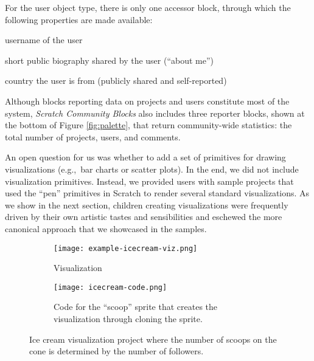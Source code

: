 \documentclass{sigchi}
\newenvironment{itemize*}%
  {\begin{itemize}%
    \setlength{\itemsep}{2pt}%
    \setlength{\parskip}{0pt}}%
  {\end{itemize}}
\begin{document}
For the user object type, there is only one accessor block, through which the following properties are made available:

\begin{itemize*}
    \item username of the user
    \item short public biography shared by the user (``about me'')
    \item country the user is from (publicly shared and self-reported)
\end{itemize*}

Although blocks reporting data on projects and users constitute most of the system, \emph{Scratch Community Blocks} also includes three reporter blocks, shown at the bottom of Figure \ref{fig:palette}, that return community-wide statistics: the total number of projects, users, and comments.

An open question for us was whether to add a set of primitives for drawing visualizations (e.g.,~bar charts or scatter plots). In the end, we did not include visualization primitives. Instead, we provided users with sample projects that used the ``pen'' primitives in Scratch to render several standard visualizations. As we show in the next section, children creating visualizations were frequently driven by their own artistic tastes and sensibilities and eschewed the more canonical approach that we showcased in the samples.

\begin{figure*}[ht]
    \centering
    \begin{subfigure}[t]{0.33\textwidth}
        \centering
        \texttt{[image: example-icecream-viz.png]}
        \caption{Visualization}
        \label{fig:example-3-viz}
    \end{subfigure}
    \hfill
    \begin{subfigure}[t]{0.65\textwidth}
        \centering
        \texttt{[image: icecream-code.png]}
        \caption{Code for the ``scoop'' sprite that creates the visualization through cloning the sprite.}
        \label{fig:example-3-code}
    \end{subfigure}
    \caption{Ice cream visualization project where the number of scoops on the cone is determined by the number of followers.}
    \label{fig:example-3}
\end{figure*}
\end{document}
